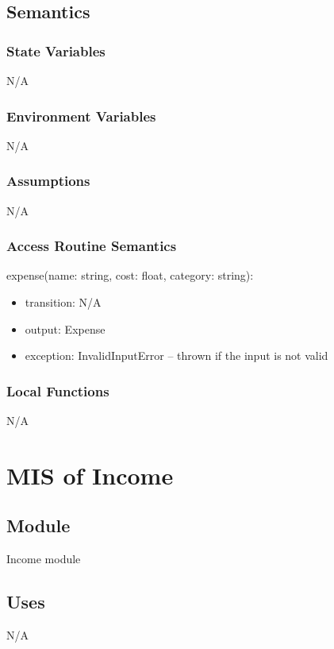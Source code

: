 \documentclass[12pt, titlepage]{article}
\begin{document}
\subsection{Semantics}

\subsubsection{State Variables}
N/A

\subsubsection{Environment Variables}
N/A

\subsubsection{Assumptions}
N/A

\subsubsection{Access Routine Semantics}

\noindent expense(name: string, cost: float, category: string):
\begin{itemize}
\item transition: N/A
\item output: Expense
\item exception: InvalidInputError -- thrown if the input is not valid
\end{itemize}

\subsubsection{Local Functions}
N/A

\newpage

\section{MIS of Income}\label{income_module}

\subsection{Module}

Income module

\subsection{Uses}
N/A
\end{document}
